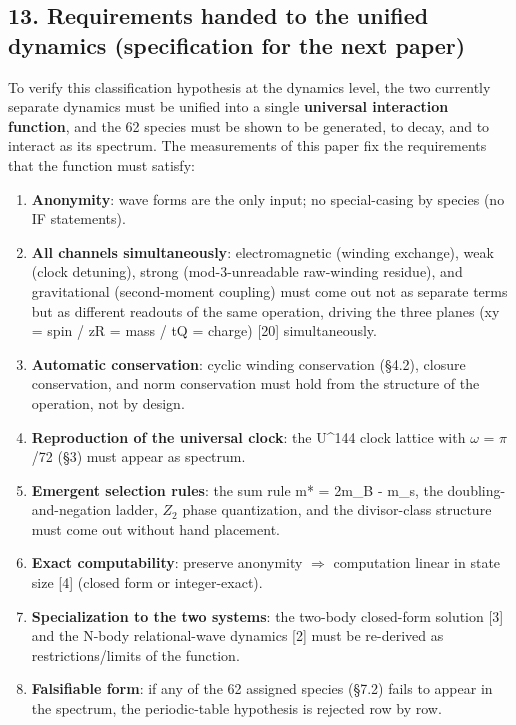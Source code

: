 \documentclass[
]{article}
\providecommand{\tightlist}{%
  \setlength{\itemsep}{0pt}\setlength{\parskip}{0pt}}
\begin{document}
\subsection{13. Requirements handed to the unified dynamics
(specification for the next
paper)}\label{requirements-handed-to-the-unified-dynamics-specification-for-the-next-paper}

To verify this classification hypothesis at the dynamics level, the two
currently separate dynamics must be unified into a single
\textbf{universal interaction function}, and the 62 species must be
shown to be generated, to decay, and to interact as its spectrum. The
measurements of this paper fix the requirements that the function must
satisfy:

\begin{enumerate}
\def\labelenumi{\arabic{enumi}.}
\tightlist
\item
  \textbf{Anonymity}: wave forms are the only input; no special-casing
  by species (no IF statements).
\item
  \textbf{All channels simultaneously}: electromagnetic (winding
  exchange), weak (clock detuning), strong (mod-3-unreadable raw-winding
  residue), and gravitational (second-moment coupling) must come out not
  as separate terms but as different readouts of the same operation,
  driving the three planes (xy = spin / zR = mass / tQ = charge)
  {[}20{]} simultaneously.
\item
  \textbf{Automatic conservation}: cyclic winding conservation (§4.2),
  closure conservation, and norm conservation must hold from the
  structure of the operation, not by design.
\item
  \textbf{Reproduction of the universal clock}: the U\^{}144 clock
  lattice with \(\omega\) = \(\pi\)/72 (§3) must appear as spectrum.
\item
  \textbf{Emergent selection rules}: the sum rule m* = 2m\_B - m\_s, the
  doubling-and-negation ladder, \(Z_2\) phase quantization, and the
  divisor-class structure must come out without hand placement.
\item
  \textbf{Exact computability}: preserve anonymity \(\Rightarrow\)
  computation linear in state size {[}4{]} (closed form or
  integer-exact).
\item
  \textbf{Specialization to the two systems}: the two-body closed-form
  solution {[}3{]} and the N-body relational-wave dynamics {[}2{]} must
  be re-derived as restrictions/limits of the function.
\item
  \textbf{Falsifiable form}: if any of the 62 assigned species (§7.2)
  fails to appear in the spectrum, the periodic-table hypothesis is
  rejected row by row.
\end{enumerate}
\end{document}
